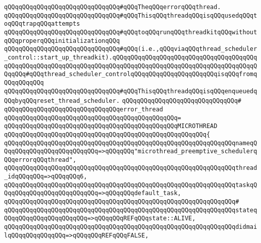 \newline
\verb|qQQqqQQqqQQqqQQqqQQqqQQqqQQqqQQq#qQQqTheqQQqerrorqQQqthread.|\newline
\verb|qQQqqQQqqQQqqQQqqQQqqQQqqQQqqQQq#qQQqThisqQQqthreadqQQqisqQQqusedqQQqtoqQQqtrapqQQqattempts|\newline
\verb|qQQqqQQqqQQqqQQqqQQqqQQqqQQqqQQq#qQQqtoqQQqrunqQQqthreadkitqQQqwithoutqQQqproperqQQqinitializationqQQq|\newline
\verb|qQQqqQQqqQQqqQQqqQQqqQQqqQQqqQQq#qQQq(i.e.,qQQqviaqQQqthread_scheduler_control::start_up_threadkit).qQQqqQQqqQQqqQQqqQQqqQQqqQQqqQQqqQQqqQQqqQQqqQQqqQQqqQQqqQQqqQQqqQQqqQQqqQQqqQQqqQQqqQQqqQQqqQQqqQQqqQQqqQQqqQQqqQQq#qQQqthread_scheduler_controlqQQqqQQqqQQqqQQqqQQqqQQqisqQQqfromqQQqqQQqqQQq|\newline
\verb|qQQqqQQqqQQqqQQqqQQqqQQqqQQqqQQq#qQQqThisqQQqthreadqQQqisqQQqenqueuedqQQqbyqQQqreset_thread_scheduler.|\newline
\verb|qQQqqQQqqQQqqQQqqQQqqQQqqQQqqQQq#|\newline
\verb|qQQqqQQqqQQqqQQqqQQqqQQqqQQqqQQqerror_thread|\newline
\verb|qQQqqQQqqQQqqQQqqQQqqQQqqQQqqQQqqQQqqQQqqQQqqQQq=|\newline
\verb|qQQqqQQqqQQqqQQqqQQqqQQqqQQqqQQqqQQqqQQqqQQqqQQqMICROTHREAD|\newline
\verb|qQQqqQQqqQQqqQQqqQQqqQQqqQQqqQQqqQQqqQQqqQQqqQQqqQQqqQQq{|\newline
\verb|qQQqqQQqqQQqqQQqqQQqqQQqqQQqqQQqqQQqqQQqqQQqqQQqqQQqqQQqqQQqqQQqnameqQQqqQQqqQQqqQQqqQQqqQQqqQQq=>qQQqqQQq"microthread_preemptive_schedulerqQQqerrorqQQqthread",|\newline
\verb|qQQqqQQqqQQqqQQqqQQqqQQqqQQqqQQqqQQqqQQqqQQqqQQqqQQqqQQqqQQqqQQqthread_idqQQqqQQq=>qQQqqQQq6,|\newline
\verb|qQQqqQQqqQQqqQQqqQQqqQQqqQQqqQQqqQQqqQQqqQQqqQQqqQQqqQQqqQQqqQQqtaskqQQqqQQqqQQqqQQqqQQqqQQqqQQq=>qQQqqQQqdefault_task,|\newline
\verb|qQQqqQQqqQQqqQQqqQQqqQQqqQQqqQQqqQQqqQQqqQQqqQQqqQQqqQQqqQQqqQQq#|\newline
\verb|qQQqqQQqqQQqqQQqqQQqqQQqqQQqqQQqqQQqqQQqqQQqqQQqqQQqqQQqqQQqqQQqstateqQQqqQQqqQQqqQQqqQQqqQQq=>qQQqqQQqREFqQQqstate::ALIVE,|\newline
\verb|qQQqqQQqqQQqqQQqqQQqqQQqqQQqqQQqqQQqqQQqqQQqqQQqqQQqqQQqqQQqqQQqdidmailqQQqqQQqqQQqqQQq=>qQQqqQQqREFqQQqFALSE,|\newline
